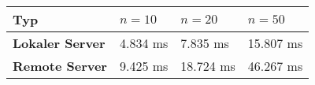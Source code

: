 \begin{tabular}{l|lll}
\rowcolor{heading}
\color{white}\textbf{Typ} &
\color{white}\textbf{$n = 10$} &
\color{white}\textbf{$n = 20$} &
\color{white}\textbf{$n = 50$} \\
\hline
\cellcolor{editorGray}\textbf{Lokaler Server} & 4.834 ms & 7.835 ms
& 15.807 ms\\
\cellcolor{editorGray}\textbf{Remote Server} & 9.425 ms & 18.724 ms &
46.267 ms\\
\hline
\end{tabular}
